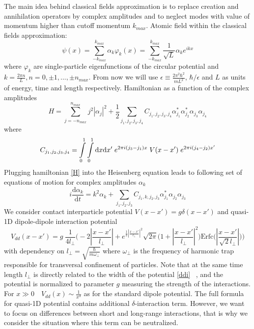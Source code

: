 \documentclass{article}
\begin{document}
    The main idea behind classical fields approximation is to replace creation and annihilation operators by complex amplitudes and to neglect modes with value of momentum higher than cutoff momentum $k_{max}$. Atomic field within the classical fields approximation:
    \begin{equation}
        \psi (x) = \sum _{-k_{max}} ^{k_{max}} \alpha  _k \varphi _k (x)=\sum _{-k_{max}} ^{k_{max}}  \frac{1}{\sqrt{L}} \alpha _k e^{ikx}
    \end{equation}
    where $\varphi _k$ are single-particle eigenfunctions of the circular potential and $k=\frac{2 \pi n}{L}, n=0,\pm 1,... , \pm n_{max}$. From now we will use $\epsilon \equiv \frac{2 \pi ^2 \hbar ^2}{m L^2}$, $\hbar/ \epsilon$ and $L$ as units of energy, time and length respectively. Hamiltonian as a function of the complex amplitudes
    \begin{equation}
    \label{Halpha}
        H=\sum_{j=-n_{max}}^{n_{max}}j^2|\alpha _j|^2+\frac{1}{2} \sum_{j_1,j_2,j_3,j_4}C_{j_1,j_2,j_3,j_4} \alpha^*_{j_1}\alpha^*_{j_2}\alpha_{j_3}\alpha_{j_4}
    \end{equation}
    where
    \begin{equation}
        C_{j_1,j_2,j_3,j_4}=\int\displaylimits_0^{1}\int\displaylimits_0^{1}\mathrm{d}x \mathrm{d}x' \; e^{2 \pi i (j_3-j_1)x} \;V(x-x') \; e^{2 \pi i (j_4-j_2)x'}
    \end{equation}
    Plugging hamiltonian \ref{H} into the Heisenberg equation leads to following set of equations of motion for complex amplitudes $\alpha _k$
    \begin{equation}\label{eqs}
        i \frac{\mathrm{d} \alpha_k}{\mathrm{d} t}=k^2 \alpha_k +\sum_{j_1,j_2,j_3}C_{j_1,k,j_2,j_3}\alpha^*_{j_1}\alpha_{j_2}\alpha_{j_3}
    \end{equation}
    We consider contact interparticle potential $V(x-x')=g \delta (x-x')$ and quasi-1D dipole-dipole interaction potential 
    \begin{equation}
    \label{ddi}
        V_{dd}(x-x')=g \; \frac{1}{4l_{\perp}}\Big(-2|\frac{x-x'}{l_{\perp}}|+e^{\frac{1}{2}|\frac{x-x'}{l_{\perp}}|^2}\sqrt{2 \pi}\big(1+|\frac{x-x'}{l_{\perp}}|^2\big)\text{Erfc}\big(|\frac{x-x'}{\sqrt{2}l_{\perp}}|\big)\Big)
    \end{equation}
     with dependency on $l_{\perp}=\sqrt{\frac{\hbar}{m \omega _{\perp}}}$ where $\omega _{\perp}$ is the frequency of harmonic trap responsible for transversal confinement of particles. Note that at the same time length $l_{\perp}$ is directly related to the width of the potential \ref{ddi} ~\cite{deuretzbacher2010ground}, and the potential is normalized to parameter $g$ measuring the strength of the interactions. For $x \gg 0  \quad V_{dd}(x) \sim \frac{1}{x^3}$ as for the standard dipole potential. The full formula for quasi-1D potential contains additional $\delta$-interaction term. However, we want to focus on differences between short and long-range interactions, that is why we consider the situation where this term can be neutralized. 
\end{document}
